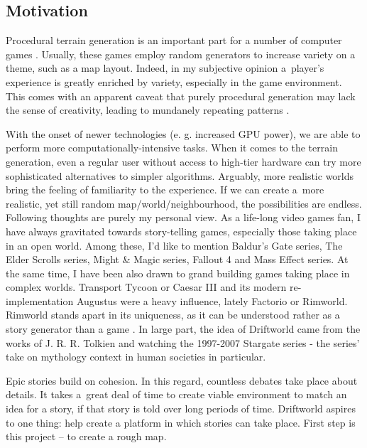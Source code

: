 \subsection{Motivation}
\label{subsec:motivation}
Procedural terrain generation is an important part for a number of computer games \cite{generatedgames}. Usually, these games employ random generators to increase variety on a theme, such as a map layout. Indeed, in my subjective opinion a~player's experience is greatly enriched by variety, especially in the game environment. This comes with an apparent caveat that purely procedural generation may lack the sense of creativity, leading to mundanely repeating patterns \cite{daggerfall}. 

With the onset of newer technologies (e. g. increased GPU power), we are able to perform more computationally-intensive tasks. When it comes to the terrain generation, even a regular user without access to high-tier hardware can try more sophisticated alternatives to simpler algorithms. Arguably, more realistic worlds bring the feeling of familiarity to the experience. If we can create a~more realistic, yet still random map/world/neighbourhood, the possibilities are endless.
\newpage
Following thoughts are purely my personal view. As a life-long video games fan, I have always gravitated towards story-telling games, especially those taking place in an open world. Among these, I'd like to mention Baldur's Gate series, The Elder Scrolls series, Might \& Magic series, Fallout 4 and Mass Effect series. At the same time, I have been also drawn to grand building games taking place in complex worlds. Transport Tycoon or Caesar III and its modern re-implementation Augustus \cite{augustus} were a heavy influence, lately Factorio or Rimworld. Rimworld stands apart in its uniqueness, as it can be understood rather as a story generator than a game \cite{rimworld}. In large part, the idea of Driftworld came from the works of J. R. R. Tolkien and watching the 1997-2007 Stargate series - the series' take on mythology context in human societies in particular.

Epic stories build on cohesion. In this regard, countless debates take place about details. It takes a~great deal of time to create viable environment to match an idea for a story, if that story is told over long periods of time. Driftworld aspires to one thing: help create a platform in which stories can take place. First step is this project -- to create a rough map. 
